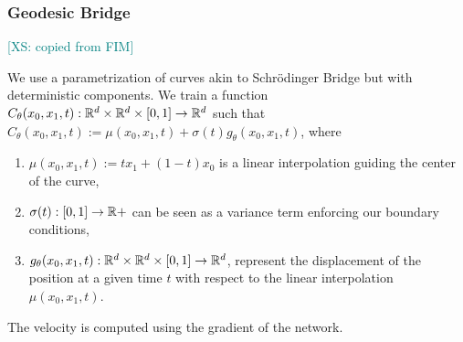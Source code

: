 \documentclass{article}
\theoremstyle{plain}
\theoremstyle{definition}
\theoremstyle{remark}
\newcommand{\gui}[1]{\textcolor{olive}{[GH: #1]}}
\newcommand{\xin}[1]{\textcolor{teal}{[XS: #1]}}
\begin{document}

\subsubsection{Geodesic Bridge}
\xin{copied from FIM}
\par We use a parametrization of curves akin to Schr\"odinger Bridge but with deterministic components. We train a function $C_\theta(x_0,x_1,t): \mathbb{R}^d \times \mathbb{R}^d \times [0,1] \to \mathbb{R}^d$ such that $C_\theta(x_0,x_1,t) := \mu(x_0,x_1,t) + \sigma(t)g_\theta(x_0,x_1,t)$, where
\begin{enumerate}
    \item $\mu(x_0, x_1, t):= tx_1 + (1-t)x_0$ is a linear interpolation guiding the center of the curve,
    \item $\sigma(t): [0,1] \to \mathbb{R}+$ can be seen as a variance term enforcing our boundary conditions,
    \item $g_\theta(x_0,x_1,t): \mathbb{R}^d \times \mathbb{R}^d \times [0,1] \to \mathbb{R}^d$, represent the displacement of the position at a given time $t$ with respect to the linear interpolation $\mu(x_0,x_1,t)$.
\end{enumerate}
\par The velocity is computed using the gradient of the network.
\end{document}
